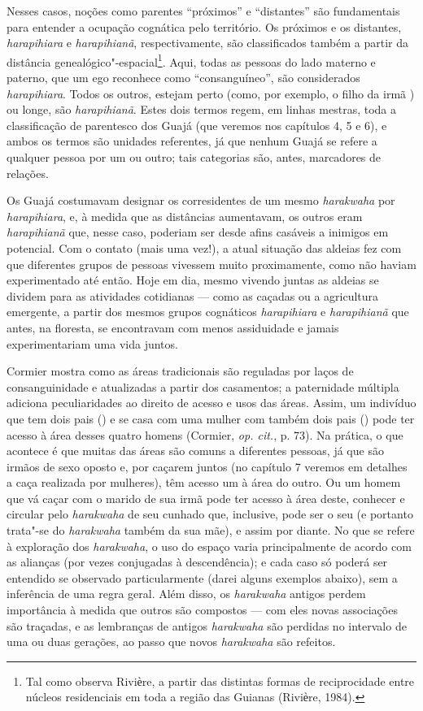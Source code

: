 Nesses casos, noções como parentes ``próximos'' e ``distantes'' são
fundamentais para entender a ocupação cognática pelo território. Os
próximos e os distantes, \emph{harapihiara} e \emph{harapihianã},
respectivamente, são classificados também a partir da distância
genealógico"-espacial\footnote{Tal como observa Riviѐre, a partir das
  distintas formas de reciprocidade entre núcleos residenciais em toda a
  região das Guianas (Riviѐre, 1984).}. Aqui, todas as pessoas do lado
materno e paterno, que um ego reconhece como ``consanguíneo'', são
considerados \emph{harapihiara}. Todos os outros, estejam perto (como,
por exemplo, o filho da irmã ) ou longe, são \emph{harapihianã}. Estes
dois termos regem, em linhas mestras, toda a classificação de parentesco
dos Guajá (que veremos nos capítulos 4, 5 e 6), e ambos os termos são
unidades referentes, já que nenhum Guajá se refere a qualquer pessoa por
um ou outro; tais categorias são, antes, marcadores de relações.

Os Guajá costumavam designar os corresidentes de um mesmo
\emph{harakwaha} por \emph{harapihiara}, e, à medida que as distâncias
aumentavam, os outros eram \emph{harapihianã} que, nesse caso, poderiam
ser desde afins casáveis a inimigos em potencial. Com o contato (mais
uma vez!), a atual situação das aldeias fez com que diferentes grupos de
pessoas vivessem muito proximamente, como não haviam experimentado até
então. Hoje em dia, mesmo vivendo juntas as aldeias se dividem para as
atividades cotidianas --- como as caçadas ou a agricultura emergente, a
partir dos mesmos grupos cognáticos \emph{harapihiara} e
\emph{harapihianã} que antes, na floresta, se encontravam com menos
assiduidade e jamais experimentariam uma vida juntos.

Cormier mostra como as áreas tradicionais são reguladas por laços de
consanguinidade e atualizadas a partir dos casamentos; a paternidade
múltipla adiciona peculiaridades ao direito de acesso e usos das áreas.
Assim, um indivíduo que tem dois pais () e se casa com uma mulher com
também dois pais () pode ter acesso à área desses quatro homens
(Cormier, \emph{op. cit.}, p. 73). Na prática, o que acontece é que muitas das
áreas são comuns a diferentes pessoas, já que são irmãos de sexo oposto
e, por caçarem juntos (no capítulo 7 veremos em detalhes a caça
realizada por mulheres), têm acesso um à área do outro. Ou um homem que
vá caçar com o marido de sua irmã pode ter acesso à área deste, conhecer
e circular pelo \emph{harakwaha} de seu cunhado que, inclusive, pode ser
o seu  (e portanto trata"-se do \emph{harakwaha} também da sua mãe), e
assim por diante. No que se refere à exploração dos \emph{harakwaha}, o
uso do espaço varia principalmente de acordo com as alianças (por vezes
conjugadas à descendência); e cada caso só poderá ser entendido se
observado particularmente (darei alguns exemplos abaixo), sem a
inferência de uma regra geral. Além disso, os \emph{harakwaha} antigos
perdem importância à medida que outros são compostos --- com eles novas
associações são traçadas, e as lembranças de antigos \emph{harakwaha}
são perdidas no intervalo de uma ou duas gerações, ao passo que novos
\emph{harakwaha} são refeitos.

